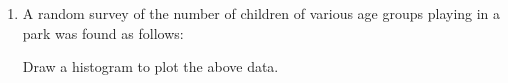 \renewcommand{\theequation}{\theenumi}
\begin{enumerate}[label=\thesection.\arabic*.,ref=\thesection.\theenumi]
\item A random survey of the number of children
of various age groups playing in a park was
found as follows:
\begin{table}[!ht]
\centering

\label{table:Q44}	
\end{table}
Draw a histogram to plot the above data.
\end{enumerate}